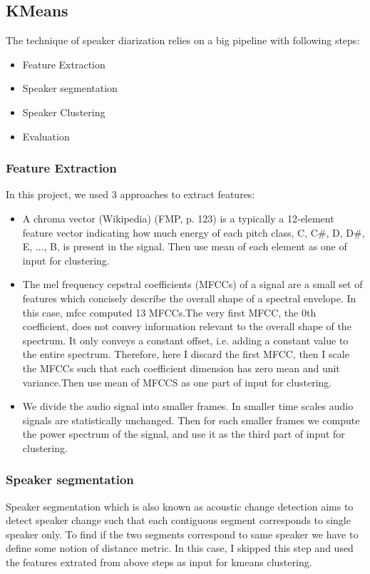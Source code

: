 \documentclass[journal, a4paper]{IEEEtran}
\begin{document}
\subsection{KMeans}
The technique of speaker diarization relies on a big pipeline with following steps:
\begin{itemize}
    \item Feature Extraction
    \item Speaker segmentation
    \item Speaker Clustering
    \item Evaluation
\end{itemize}
\subsubsection{Feature Extraction}
In this project, we used 3 approaches to extract features:
\begin{itemize}
    \item A chroma vector (Wikipedia) (FMP, p. 123) is a typically a 12-element feature vector indicating how much energy of each pitch class, {C, C\#, D, D\#, E, ..., B}, is present in the signal. Then use mean of each element as one of input for clustering.
    \item The mel frequency cepstral coefficients (MFCCs) of a signal are a small set of features  which concisely describe the overall shape of a spectral envelope. In this case, mfcc computed 13 MFCCs.The very first MFCC, the 0th coefficient, does not convey information relevant to the overall shape of the spectrum. It only conveys a constant offset, i.e. adding a constant value to the entire spectrum. Therefore, here I discard the first MFCC, then I scale the MFCCs such that each coefficient dimension has zero mean and unit variance.Then use mean of MFCCS as one part of input for clustering.
    \item We divide the audio signal into smaller frames. In smaller time scales audio signals are statistically unchanged. Then for each smaller frames we compute the power spectrum of the signal, and use it as the third part of input for clustering.
\end{itemize}
\subsubsection{Speaker segmentation}\cite{Segmentation} Speaker segmentation which is also known as acoustic change detection aims to detect speaker change such that each contiguous segment corresponds to single speaker only. To find if the two segments correspond to same speaker we have to define some notion of distance metric. In this case, I skipped this step and used the features extrated from above steps as input for kmeans clustering.
\end{document}
